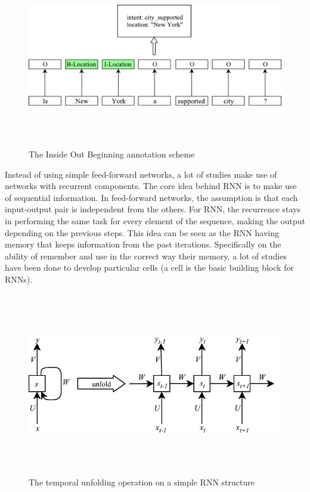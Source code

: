 \begin{figure}[!htbp]
    \centering
    \includegraphics[max width=\linewidth,max height=8cm,keepaspectratio]{figures/iob}
    \caption{The Inside Out Beginning annotation scheme}\label{fig:iob}
\end{figure}

Instead of using simple feed-forward networks, a lot of studies make use of networks with recurrent components. The core idea behind RNN is to make use of sequential information. In feed-forward networks, the assumption is that each input-output pair is independent from the others. For RNN, the recurrence stays in performing the same task for every element of the sequence, making the output depending on the previous steps. This idea can be seen as the RNN having memory that keeps information from the past iterations. Specifically on the ability of remember and use in the correct way their memory, a lot of studies have been done to develop particular cells (a cell is the basic building block for RNNs).


\begin{figure}[!htbp]
    \centering
    \includegraphics[max width=\linewidth,max height=8cm,keepaspectratio]{figures/rnnUnfold}
    \caption{The temporal unfolding operation on a simple RNN structure}\label{fig:rnnUnfold}
\end{figure}

